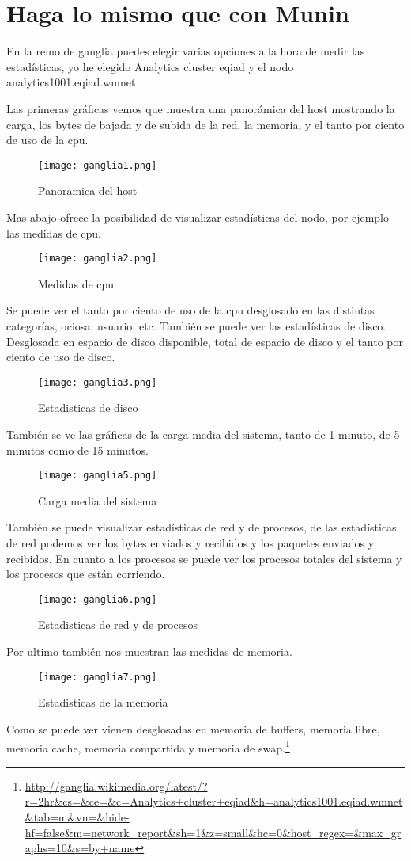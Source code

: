 \section{Haga lo mismo que con Munin}

En la remo de ganglia puedes elegir varias opciones a la hora de medir las estadísticas, yo he elegido Analytics cluster eqiad y el nodo analytics1001.eqiad.wmnet

Las primeras gráficas vemos que muestra una panorámica del host mostrando la carga, los bytes de bajada y de subida de la red, la memoria, y el tanto por ciento de uso de la cpu.
\begin{figure}[H] 
\centering
\texttt{[image: ganglia1.png]}  
\label{figura23:}
\caption{Panoramica del host}
\end{figure}
Mas abajo ofrece la posibilidad de visualizar estadísticas del nodo, por ejemplo las medidas de cpu.
\begin{figure}[H] 
\centering
\texttt{[image: ganglia2.png]}  
\label{figura23:}
\caption{Medidas de cpu}
\end{figure}
Se puede ver el tanto por ciento de uso de la cpu desglosado en las distintas categorías, ociosa, usuario, etc.
También se puede ver las estadísticas de disco.
Desglosada en espacio de disco disponible, total de espacio de disco y el tanto por ciento de uso de disco.
\begin{figure}[H] 
\centering
\texttt{[image: ganglia3.png]}  
\label{figura23:}
\caption{Estadisticas de disco}
\end{figure}
También se ve las gráficas de la carga media del sistema, tanto de 1 minuto, de 5 minutos como de 15 minutos.
\begin{figure}[H] 
\centering
\texttt{[image: ganglia5.png]}  
\label{figura23:}
\caption{Carga media del sistema}
\end{figure}
También se puede visualizar estadísticas de red y de procesos, de las estadísticas de red podemos ver los bytes enviados y recibidos y los paquetes enviados y recibidos. En cuanto a los procesos se puede ver los procesos totales del sistema y los procesos que están corriendo.
\begin{figure}[H] 
\centering
\texttt{[image: ganglia6.png]}  
\label{figura23:}
\caption{Estadisticas de red y de procesos}
\end{figure}
Por ultimo también nos muestran las medidas de memoria.
\begin{figure}[H] 
\centering
\texttt{[image: ganglia7.png]}  
\label{figura23:}
\caption{Estadisticas de la memoria}
\end{figure}
Como se puede ver vienen desglosadas en memoria de buffers, memoria libre, memoria cache, memoria compartida y memoria de swap.\footnote{\url{http://ganglia.wikimedia.org/latest/?r=2hr&cs=&ce=&c=Analytics+cluster+eqiad&h=analytics1001.eqiad.wmnet&tab=m&vn=&hide-hf=false&m=network_report&sh=1&z=small&hc=0&host_regex=&max_graphs=10&s=by+name}}
